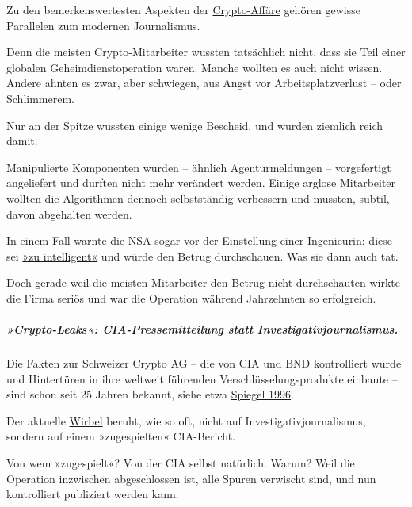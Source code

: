 Zu den bemerkens­wertesten Aspekten der
\href{https://www.tagesanzeiger.ch/schweiz/standard/riesige-spionageoperation-der-cia-lief-ueber-die-schweiz/story/20957930}{Crypto-Affäre}
gehören gewisse Parallelen zum modernen Journalismus.

Denn die meisten Crypto-Mitarbeiter wussten tatsächlich nicht, dass sie
Teil einer globalen Geheim­dienst­operation waren. Manche wollten es
auch nicht wissen. Andere ahnten es zwar, aber schwiegen, aus Angst vor
Arbeits­platz­verlust -- oder Schlimmerem.

Nur an der Spitze wussten einige wenige Bescheid, und wurden ziemlich
reich damit.

Manipulierte Komponenten wurden -- ähnlich
\href{https://swprs.org/der-propaganda-multiplikator/}{Agenturmeldungen}
-- vorgefertigt angeliefert und durften nicht mehr verändert werden.
Einige arglose Mitarbeiter wollten die Algorithmen dennoch
selbst­ständig verbessern und mussten, subtil, davon abgehalten werden.

In einem Fall warnte die NSA sogar vor der Einstellung einer
Ingenieurin: diese sei
\href{https://www.washingtonpost.com/graphics/2020/world/national-security/cia-crypto-encryption-machines-espionage/img/pdfs/brightengineer.jpg}{»zu
intelligent«} und würde den Betrug durch­schauen. Was sie dann auch tat.

Doch gerade weil die meisten Mitarbeiter den Betrug nicht durchschauten
wirkte die Firma seriös und war die Operation während Jahrzehnten so
erfolgreich.

\hypertarget{crypto-leaks-cia-pressemitteilung-statt-investigativjournalismus}{%
\subparagraph{\texorpdfstring{\textbf{»Crypto-Leaks«:
CIA-Pressemitteilung statt
Investigativ­journalismus.}}{»Crypto-Leaks«: CIA-Pressemitteilung statt Investigativ­journalismus.}}\label{crypto-leaks-cia-pressemitteilung-statt-investigativjournalismus}}

Die Fakten zur Schweizer Crypto AG -- die von CIA und BND kontrolliert
wurde und Hinter­türen in ihre weltweit führenden
Ver­schlüs­se­lungs­­produkte einbaute -- sind schon seit 25 Jahren
bekannt, siehe etwa
\href{https://magazin.spiegel.de/EpubDelivery/spiegel/pdf/9088423}{Spiegel
1996}.

Der aktuelle
\href{https://www.tagesanzeiger.ch/schweiz/standard/riesige-spionageoperation-der-cia-lief-ueber-die-schweiz/story/20957930}{Wirbel}
beruht, wie so oft, nicht auf Investigativ­journalismus, sondern auf
einem »zugespielten« CIA-Bericht.

Von wem »zugespielt«? Von der CIA selbst na­tür­lich. Warum? Weil die
Operation inzwi­schen abgeschlossen ist, alle Spuren verwischt sind, und
nun kontrolliert publiziert werden kann.

